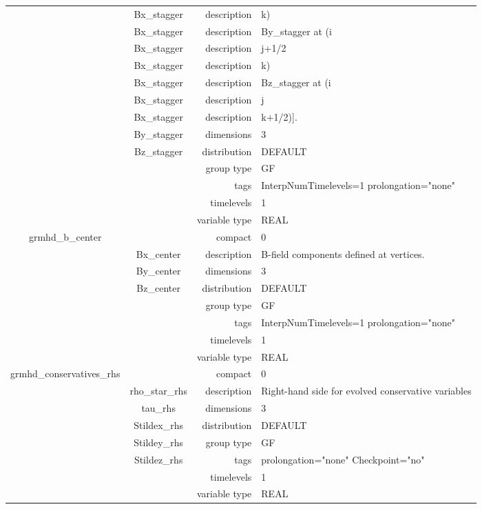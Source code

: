 \documentclass{article}
\begin{document}
\begin{tabular*}{150mm}{|c|c@{\extracolsep{\fill}}|rl|}
 & Bx\_stagger & description & k) \\ 
 & Bx\_stagger & description & By\_stagger at (i \\ 
 & Bx\_stagger & description & j+1/2 \\ 
 & Bx\_stagger & description & k) \\ 
 & Bx\_stagger & description & Bz\_stagger at (i \\ 
 & Bx\_stagger & description & j \\ 
 & Bx\_stagger & description & k+1/2)]. \\ 
 & By\_stagger & dimensions & 3 \\ 
 & Bz\_stagger & distribution & DEFAULT \\ 
 &  & group type & GF \\ 
 &  & tags & InterpNumTimelevels=1 prolongation="none" \\ 
 &  & timelevels & 1 \\ 
 &  & variable type & REAL \\ 
\hline 
grmhd\_b\_center &  & compact & 0 \\ 
 & Bx\_center & description & B-field components defined at vertices. \\ 
 & By\_center & dimensions & 3 \\ 
 & Bz\_center & distribution & DEFAULT \\ 
 &  & group type & GF \\ 
 &  & tags & InterpNumTimelevels=1 prolongation="none" \\ 
 &  & timelevels & 1 \\ 
 &  & variable type & REAL \\ 
\hline 
grmhd\_conservatives\_rhs &  & compact & 0 \\ 
 & rho\_star\_rhs & description & Right-hand side for evolved conservative variables \\ 
 & tau\_rhs & dimensions & 3 \\ 
 & Stildex\_rhs & distribution & DEFAULT \\ 
 & Stildey\_rhs & group type & GF \\ 
 & Stildez\_rhs & tags & prolongation="none" Checkpoint="no" \\ 
 &  & timelevels & 1 \\ 
 &  & variable type & REAL \\ 
\hline 
\end{tabular*} 



\vspace{5mm}
\vspace{5mm}
\end{document}
